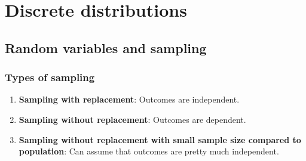 
\chapter{Discrete distributions}

\section{Random variables and sampling}
\subsection{Types of sampling}

\begin{enumerate}
    \item \textbf{Sampling with replacement}: Outcomes are independent.
    \item \textbf{Sampling without replacement}: Outcomes are dependent.
    \item \textbf{Sampling without replacement with small sample size compared to population}: Can assume that outcomes are pretty much independent.
\end{enumerate}


